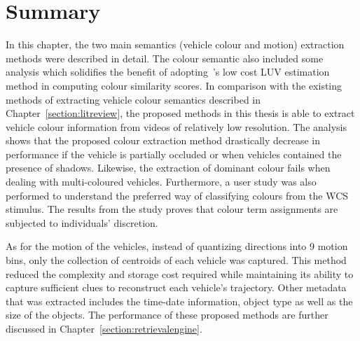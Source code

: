 
\section{Summary}
In this chapter, the two main semantics (vehicle colour and motion) extraction methods were described in detail. The colour semantic also included some analysis which solidifies the benefit of adopting~'s low cost LUV estimation method in computing colour similarity scores.
In comparison with the existing methods of extracting vehicle colour semantics described in Chapter~\ref{section:litreview}, the proposed methods in this thesis is able to extract vehicle colour information from videos of relatively low resolution.
The analysis shows that the proposed colour extraction method drastically decrease in performance if the vehicle is partially occluded or when vehicles contained the presence of shadows. Likewise, the extraction of dominant colour fails when dealing with multi-coloured vehicles.
Furthermore, a user study was also performed to understand the preferred way of classifying colours from the WCS stimulus. The results from the study proves that colour term assignments are subjected to individuals' discretion.

As for the motion of the vehicles, instead of quantizing directions into 9 motion bins, only the collection of centroids of each vehicle was captured. This method reduced the complexity and storage cost required while maintaining its ability to capture sufficient clues to reconstruct each vehicle's trajectory.
Other metadata that was extracted includes the time-date information, object type as well as the size of the objects.
The performance of these proposed methods are further discussed in Chapter~\ref{section:retrievalengine}.





